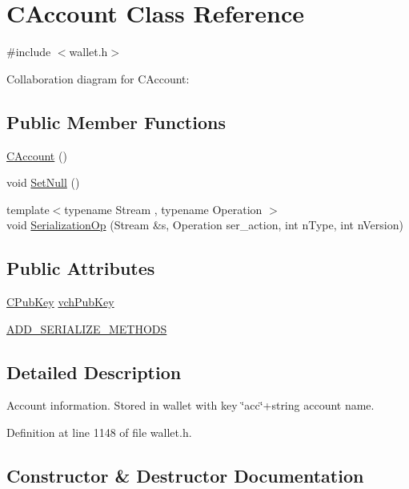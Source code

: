 \hypertarget{class_c_account}{}\section{C\+Account Class Reference}
\label{class_c_account}


{\ttfamily \#include $<$wallet.\+h$>$}



Collaboration diagram for C\+Account\+:
\subsection*{Public Member Functions}
\begin{DoxyCompactItemize}
\item 
\hyperlink{class_c_account_ab0a7f36214a23839cc8180a15b97f53f}{C\+Account} ()
\item 
void \hyperlink{class_c_account_ac63a4127fd899a21a5916a86588e809a}{Set\+Null} ()
\item 
{\footnotesize template$<$typename Stream , typename Operation $>$ }\\void \hyperlink{class_c_account_a645167419dead15544700e6ab2280a10}{Serialization\+Op} (Stream \&s, Operation ser\+\_\+action, int n\+Type, int n\+Version)
\end{DoxyCompactItemize}
\subsection*{Public Attributes}
\begin{DoxyCompactItemize}
\item 
\hyperlink{class_c_pub_key}{C\+Pub\+Key} \hyperlink{class_c_account_a8bc9b476371009c12a6c25d4c7264de5}{vch\+Pub\+Key}
\item 
\hyperlink{class_c_account_ad1054a718063912b1c5e1103eaa005cc}{A\+D\+D\+\_\+\+S\+E\+R\+I\+A\+L\+I\+Z\+E\+\_\+\+M\+E\+T\+H\+O\+D\+S}
\end{DoxyCompactItemize}


\subsection{Detailed Description}
Account information. Stored in wallet with key \char`\"{}acc\char`\"{}+string account name. 

Definition at line 1148 of file wallet.\+h.



\subsection{Constructor \& Destructor Documentation}
\hypertarget{class_c_account_ab0a7f36214a23839cc8180a15b97f53f}{}
